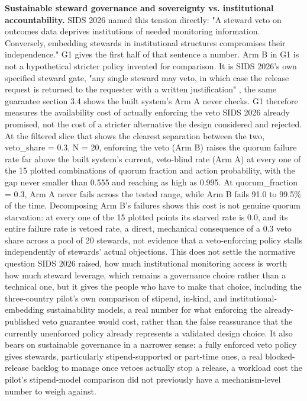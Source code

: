 \textbf{Sustainable steward governance and sovereignty vs. institutional accountability.} SIDS 2026 named this tension directly: "A steward veto on outcomes data deprives institutions of needed monitoring information. Conversely, embedding stewards in institutional structures compromises their independence." G1 gives the first half of that sentence a number. Arm B in G1 is not a hypothetical stricter policy invented for comparison. It is SIDS 2026's own specified steward gate, "any single steward may veto, in which case the release request is returned to the requester with a written justification" \cite{katrakazas2026}, the same guarantee section 3.4 shows the built system's Arm A never checks. G1 therefore measures the availability cost of actually enforcing the veto SIDS 2026 already promised, not the cost of a stricter alternative the design considered and rejected. At the filtered slice that shows the clearest separation between the two, veto\_share = 0.3, N = 20, enforcing the veto (Arm B) raises the quorum failure rate far above the built system's current, veto-blind rate (Arm A) at every one of the 15 plotted combinations of quorum fraction and action probability, with the gap never smaller than 0.555 and reaching as high as 0.995. At quorum\_fraction = 0.3, Arm A never fails across the tested range, while Arm B fails 91.0 to 99.5\% of the time. Decomposing Arm B's failures shows this cost is not genuine quorum starvation: at every one of the 15 plotted points its starved rate is 0.0, and its entire failure rate is vetoed rate, a direct, mechanical consequence of a 0.3 veto share across a pool of 20 stewards, not evidence that a veto-enforcing policy stalls independently of stewards' actual objections. This does not settle the normative question SIDS 2026 raised, how much institutional monitoring access is worth how much steward leverage, which remains a governance choice rather than a technical one, but it gives the people who have to make that choice, including the three-country pilot's own comparison of stipend, in-kind, and institutional-embedding sustainability models, a real number for what enforcing the already-published veto guarantee would cost, rather than the false reassurance that the currently unenforced policy already represents a validated design choice. It also bears on sustainable governance in a narrower sense: a fully enforced veto policy gives stewards, particularly stipend-supported or part-time ones, a real blocked-release backlog to manage once vetoes actually stop a release, a workload cost the pilot's stipend-model comparison did not previously have a mechanism-level number to weigh against.

